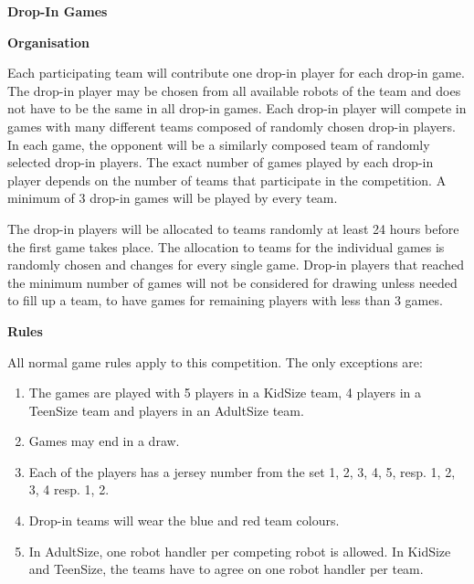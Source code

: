 \bigskip

{\bfseries Drop-In Games}

\headlinebox

{\bfseries Organisation}

Each participating team will contribute one drop-in player for each drop-in game. The drop-in player may be chosen from all available robots of the team and does not have to be the same in all drop-in games. Each drop-in player will compete in games with many different teams composed of randomly chosen drop-in players. In each game, the opponent will  be a similarly composed team of randomly selected drop-in players. The exact number of games played by each drop-in player depends on the number of teams that participate in the competition. A minimum of 3 drop-in games will be played by every team.

\bigskip

The drop-in players will be allocated to teams randomly at least 24 hours before the first game takes place. The allocation to teams for the individual games is randomly chosen and changes for every single game. Drop-in players that reached the minimum number of games will not be considered for drawing unless needed to fill up a team, to have games for remaining players with less than 3 games.

\bigskip

{\bfseries Rules}

All normal game rules apply to this competition. The only exceptions are:
\begin{enumerate}
\item The games are played with 5 players in a KidSize team,
      4 players in a TeenSize team and  players in an AdultSize team.
\item Games may end in a draw.
\item Each of the players has a jersey number from the set {1, 2, 3, 4, 5}, resp. {1, 2, 3, 4} resp. {1, 2}.
\item Drop-in teams will wear the blue and red team colours.
\item In AdultSize, one robot handler per competing robot is allowed. In KidSize and TeenSize, the teams have to agree on one robot handler per team.
\end{enumerate}


